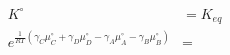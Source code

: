 \begin{eqnarray}
K^\circ & = K_{eq} \\
e^{\frac{1}{RT}\left(\gamma_C\mu_C^\circ+ \gamma_D\mu_D^\circ -\gamma_A\mu_A^\circ-\gamma_B\mu_B^\circ\right)}& = 
\end{eqnarray}